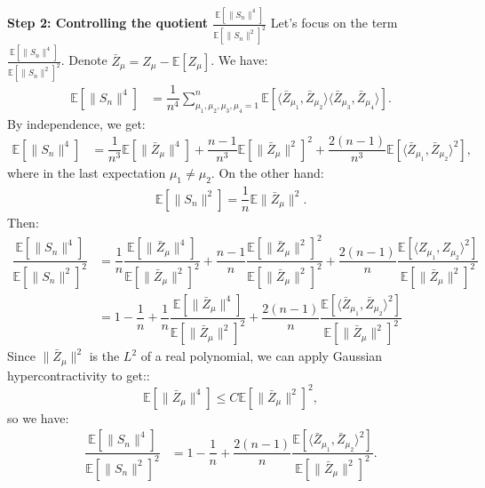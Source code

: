 \documentclass[]{article}
\numberwithin{equation}{section}
\theoremstyle{definition}
\newcommand{\EE}{\mathbb{E}}
\begin{document}
\textbf{Step 2: Controlling the quotient $\frac{\EE \left [ \|S_{n}\|^4 \right ]}{\EE \left [ \| S_{n}\|^2\right ]^2}$} Let's focus on the term $\frac{\EE \left [ \|S_{n}\|^4 \right ] }{\EE \left [ \| S_{n}\|^2\right ]^2}$. Denote $\bar{Z}_\mu = Z_\mu - \EE[Z_\mu]$. We have:  
\begin{align}
    \EE \left [ \| S_{n} \|^{4}\right ] & =  \dfrac{1}{n^4} \sum_{\mu_1, \mu_2,\mu_3,\mu_4 = 1}^{n} \EE \left [\langle \bar{Z}_{\mu_1}, \bar{Z}_{\mu_2}\rangle \langle \bar{Z}_{\mu_3}, \bar{Z}_{\mu_4}\rangle \right].
\end{align}
By independence, we get: 
\begin{align}
    \EE \left [ \| S_{n} \|^{4}\right ] & =  \dfrac{1}{n^3} \EE \left [\|\bar{Z}_\mu \|^4\right] + \dfrac{n-1}{n^3}\EE[\|\bar{Z}_\mu\|^2]^2 + \dfrac{2(n-1)}{n^3} \EE\left [ \langle \bar{Z}_{\mu_1}, \bar{Z}_{\mu_2} \rangle^{2}\right ],
\end{align}
where in the last expectation $\mu_1\not=\mu_2$.  On the other hand:
\begin{align}
    \EE \left [\|S_{n}\|^2\right ] =  \dfrac{1}{n}\EE \| \bar{Z}_{\mu}\|^2. 
\end{align}
Then: 
\begin{align}
     \dfrac{\EE \left [ \| S_{n} \|^{4}\right ]}{\EE \left [ \|S_{n}\|^2\right ]^2} & =  \dfrac{1}{n} \dfrac{\EE \left [\|\bar{Z}_\mu \|^4\right]}{\EE \left [\| \bar{Z}_{\mu}\|^2 \right ]^2} + \dfrac{n-1}{n}\dfrac{\EE[\|\bar{Z}_\mu\|^2]^2}{\EE \left [\| \bar{Z}_{\mu}\|^2 \right ]^2} + \dfrac{2(n-1)}{n} \dfrac{\EE\left [ \langle Z_{\mu_1}, Z_{\mu_2} \rangle^{2}\right ]}{\EE \left [\| \bar{Z}_{\mu}\|^2 \right ]^2} \\
     & = 1-\dfrac{1}{n} +\dfrac{1}{n} \dfrac{\EE \left [\|\bar{Z}_\mu \|^4\right]}{\EE \left [\| \bar{Z}_{\mu}\|^2 \right ]^2} + \dfrac{2(n-1)}{n} \dfrac{\EE\left [ \langle \bar{Z}_{\mu_1}, \bar{Z}_{\mu_2} \rangle^{2}\right ]}{\EE \left [\| \bar{Z}_{\mu}\|^2 \right ]^2}
     \label{eq:exact_computation_4_2_moments}
\end{align}
Since $\| \bar{Z}_\mu \|^2$ is the $L^2$ of a real polynomial, we can apply Gaussian hypercontractivity  to get:: 
\begin{equation}
    \mathbb{E} \left [ \| \bar{Z}_\mu\|^{4}\right ] \leq  C\EE \left [\|\bar{Z}_\mu\|^{2} \right ]^{2}, 
\label{eq:constant_hypercontractivity}
\end{equation}
so we have: 
\begin{align}
     \dfrac{\EE \left [ \| S_{n} \|^{4}\right ]}{\EE \left [ \|S_{n}\|^2\right ]^2} & = 1-\dfrac{1}{n} + \dfrac{2(n-1)}{n} \dfrac{\EE\left [ \langle \bar{Z}_{\mu_1}, \bar{Z}_{\mu_2} \rangle^{2}\right ]}{\EE \left [\| \bar{Z}_{\mu}\|^2 \right ]^2}.
\end{align}
\end{document}
